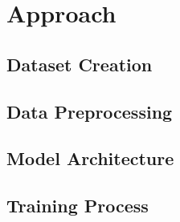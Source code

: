 \section{Approach}  \label{approach}

\subsection{Dataset Creation}  \label{ch:approachA}


\subsection{Data Preprocessing}  \label{ch:approachB}

\subsection{Model Architecture}  \label{ch:approachC}


\subsection{Training Process} \label{ch:approachD}


\newpage
